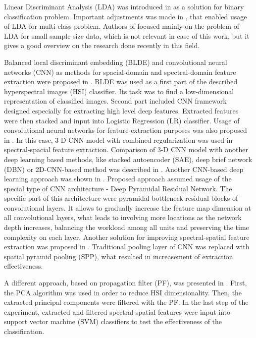 \documentclass[a4paper, 10 pt, conference]{ieeeconf}
\begin{document}
Linear Discriminant Analysis (LDA) was introduced in \cite{LDA} as a solution for binary classification problem. Important adjustments was made in \cite{multi_LDA}, that enabled usage of LDA for multi-class problem. Authors of \cite{LDA_recent} focused mainly on the problem of LDA for small sample size data, which is not relevant in case of this work, but it gives a good overview on the research done recently in this field.

Balanced local discriminant embedding (BLDE) and convolutional neural networks (CNN) as methods for spacial-domain and spectral-domain feature extraction were proposed in \cite{blde-cnn}. BLDE was used as a first part of the described hyperspectral images (HSI) classifier. Its task was to find a low-dimensional representation of classified images. Second part included CNN framework designed especially for extracting high level deep features. Extracted features were then stacked and input into Logistic Regression (LR) classifier. Usage of convolutional neural networks for feature extraction purposes was also proposed in \cite{cnn}. In this case, 3-D CNN model with combined regularization was used in spectral-spacial feature extraction. Comparison of 3-D CNN model with another deep learning based methods, like stacked autoencoder (SAE), deep brief network (DBN) or 2D-CNN-based method was described in \cite{cnn2}. Another CNN-based deep learning approach was shown in \cite{cnn3}. Proposed approach assumed usage of the special type of CNN architecture - Deep Pyramidal Residual Network. The specific part of this architecture were pyramidal bottleneck residual blocks of convolutional layers. It allows to gradually increase the feature map dimension at all convolutional layers, what leads to involving more locations as the network depth increases, balancing the workload among all units and preserving the time complexity on each layer. Another solution for improving spectral-spatial feature extraction was proposed in \cite{cnn4}. Traditional pooling layer of CNN was replaced with spatial pyramid pooling (SPP), what resulted in increasement of extraction effectiveness.

A different approach, based on propagation filter (PF), was presented in \cite{propagation-filter}. First, the PCA algorithm was used in order to reduce HSI dimensionality. Then, the extracted principal components were filtered with the PF. In the last step of the experiment, extracted and filtered spectral-spatial features were input into support vector machine (SVM) classifiers to test the effectiveness of the classification.
\end{document}
